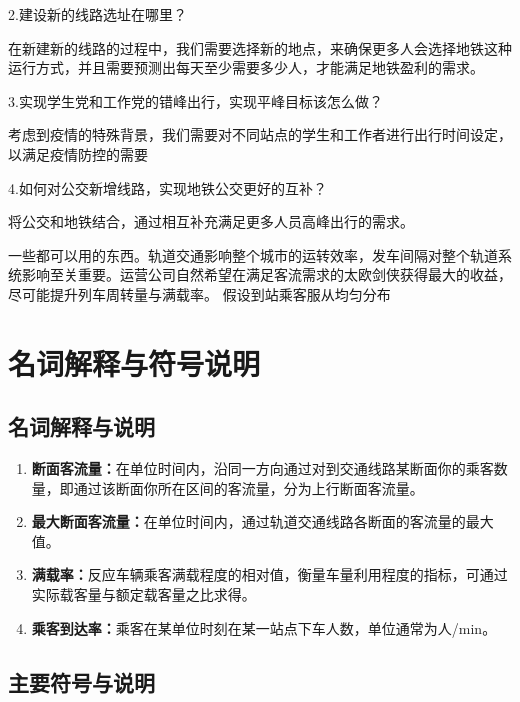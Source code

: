 \documentclass[12pt,a4paper]{mcmthesis}
\newcommand\wordc[1]{\textbf{#1}}
\begin{document}
  {2.建设新的线路选址在哪里？}

  {在新建新的线路的过程中，我们需要选择新的地点，来确保更多人会选择地铁这种运行方式，并且需要预测出每天至少需要多少人，才能满足地铁盈利的需求。}

  {3.实现学生党和工作党的错峰出行，实现平峰目标该怎么做？}

   {考虑到疫情的特殊背景，我们需要对不同站点的学生和工作者进行出行时间设定，以满足疫情防控的需要}

  {4.如何对公交新增线路，实现地铁公交更好的互补？}

   {将公交和地铁结合，通过相互补充满足更多人员高峰出行的需求。}
  
  {一些都可以用的东西。轨道交通影响整个城市的运转效率，发车间隔对整个轨道系统影响至关重要。运营公司自然希望在满足客流需求的太欧剑侠获得最大的收益，尽可能提升列车周转量与满载率。}
  {假设到站乘客服从均匀分布}



\section{名词解释与符号说明}

\subsection{名词解释与说明}
\begin{enumerate}
	\item \wordc{断面客流量：}在单位时间内，沿同一方向通过对到交通线路某断面你的乘客数量，即通过该断面你所在区间的客流量，分为上行断面客流量。

	\item \wordc{最大断面客流量：}在单位时间内，通过轨道交通线路各断面的客流量的最大值。

	\item \wordc{满载率：}反应车辆乘客满载程度的相对值，衡量车量利用程度的指标，可通过实际载客量与额定载客量之比求得。

	\item \wordc{乘客到达率：}乘客在某单位时刻在某一站点下车人数，单位通常为人/min。




\end{enumerate}
\subsection{主要符号与说明}
\end{document}
